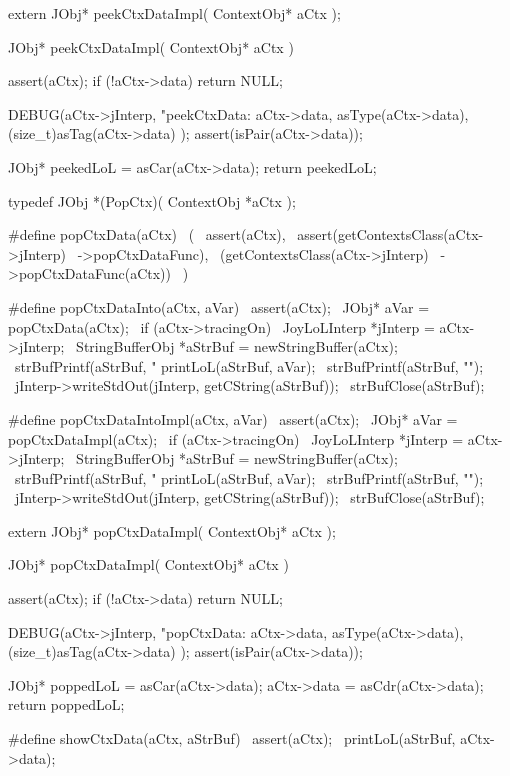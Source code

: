 \startCHeader
extern JObj* peekCtxDataImpl(
  ContextObj* aCtx
);
\stopCHeader
{}

\startCCode
JObj* peekCtxDataImpl(
  ContextObj* aCtx
) {
  assert(aCtx);
  if (!aCtx->data) return NULL;

  DEBUG(aCtx->jInterp, "peekCtxData: %
    aCtx->data, asType(aCtx->data), (size_t)asTag(aCtx->data)
  );
  assert(isPair(aCtx->data));
  
  JObj* peekedLoL = asCar(aCtx->data);
  return peekedLoL;
}
\stopCCode

\startCHeader
typedef JObj *(PopCtx)(
  ContextObj *aCtx
);

#define popCtxData(aCtx)                    \
  (                                         \
    assert(aCtx),                           \
    assert(getContextsClass(aCtx->jInterp)  \
      ->popCtxDataFunc),                    \
    (getContextsClass(aCtx->jInterp)        \
      ->popCtxDataFunc(aCtx))               \
  )

#define popCtxDataInto(aCtx, aVar)                    \
assert(aCtx);                                         \
JObj* aVar = popCtxData(aCtx);                        \
if (aCtx->tracingOn) {                                \
  JoyLoLInterp *jInterp = aCtx->jInterp;              \
  StringBufferObj *aStrBuf = newStringBuffer(aCtx);   \
  strBufPrintf(aStrBuf, "%
  printLoL(aStrBuf, aVar);                            \
  strBufPrintf(aStrBuf, "\n");                        \
  jInterp->writeStdOut(jInterp, getCString(aStrBuf)); \
  strBufClose(aStrBuf);                               \
}

#define popCtxDataIntoImpl(aCtx, aVar)                \
assert(aCtx);                                         \
JObj* aVar = popCtxDataImpl(aCtx);                    \
if (aCtx->tracingOn) {                                \
  JoyLoLInterp *jInterp = aCtx->jInterp;              \
  StringBufferObj *aStrBuf = newStringBuffer(aCtx);   \
  strBufPrintf(aStrBuf, "%
  printLoL(aStrBuf, aVar);                            \
  strBufPrintf(aStrBuf, "\n");                        \
  jInterp->writeStdOut(jInterp, getCString(aStrBuf)); \
  strBufClose(aStrBuf);                               \
}
\stopCHeader

\setCHeaderStream{private}
\startCHeader
extern JObj* popCtxDataImpl(
  ContextObj* aCtx
);
\stopCHeader
\setCHeaderStream{public}

\startCCode
JObj* popCtxDataImpl(
  ContextObj* aCtx
) {
  assert(aCtx);
  if (!aCtx->data) return NULL;

  DEBUG(aCtx->jInterp, "popCtxData: %
    aCtx->data, asType(aCtx->data), (size_t)asTag(aCtx->data)
  );
  assert(isPair(aCtx->data));
  
  JObj* poppedLoL = asCar(aCtx->data);
  aCtx->data      = asCdr(aCtx->data);
  return poppedLoL;
}
\stopCCode

\startCHeader
#define showCtxData(aCtx, aStrBuf)  \
  assert(aCtx);                     \
  printLoL(aStrBuf, aCtx->data);    \
\stopCHeader

